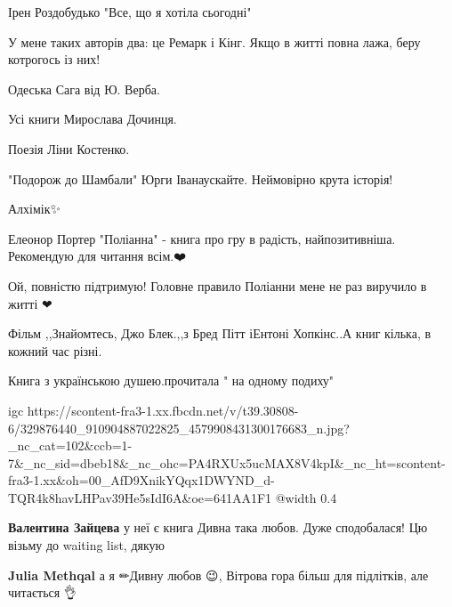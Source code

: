 
Ірен Роздобудько "Все, що я хотіла сьогодні"


У мене таких авторів два: це Ремарк і Кінг. Якщо в житті повна лажа, беру котрогось із них!


Одеська Сага від Ю. Верба.


Усі книги Мирослава Дочинця.


Поезія Ліни Костенко.


"Подорож до Шамбали" Юрги Іванаускайте. Неймовірно крута історія!


Алхімік✨


Елеонор Портер "Поліанна" - книга про гру в радість, найпозитивніша. Рекомендую
для читання всім.❤️

\begin{itemize} %
Ой, повністю підтримую! Головне правило Поліанни мене не раз виручило в житті ❤
\end{itemize} %


Фільм ,,Знайомтесь, Джо Блек.,,з Бред Пітт іЕнтоні Хопкінс..А книг кілька, в кожний час різні.


Книга з українською душею.прочитала " на одному подиху"

\ifcmt
  igc https://scontent-fra3-1.xx.fbcdn.net/v/t39.30808-6/329876440_910904887022825_4579908431300176683_n.jpg?_nc_cat=102&ccb=1-7&_nc_sid=dbeb18&_nc_ohc=PA4RXUx5ucMAX8V4kpI&_nc_ht=scontent-fra3-1.xx&oh=00_AfD9XnikYQqx1DWYND_d-TQR4k8havLHPav39He5sIdI6A&oe=641AA1F1
	@width 0.4
\fi

\begin{itemize} %
\textbf{Валентина Зайцева} у неї є книга Дивна така любов. Дуже сподобалася! Цю візьму до waiting list, дякую

\textbf{Julia Methqal} а я ✏Дивну любов 😉, Вітрова гора більш для підлітків, але читається 👌
\end{itemize} %

